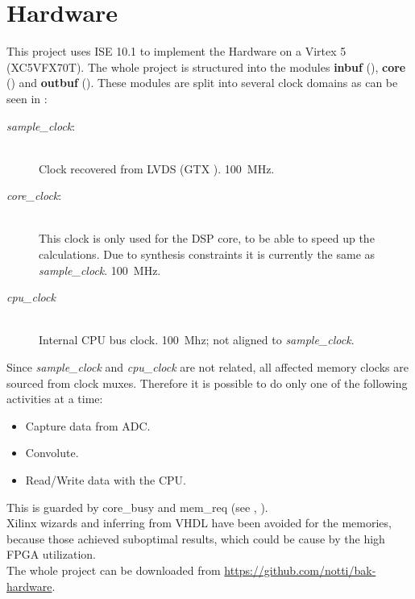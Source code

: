 \documentclass[11pt,technote,a4paper,onecolumn,dvips]{IEEEtran}
\newcommand{\signal}[1]{{\ttfamily #1}}
\newcommand{\module}[1]{{\ttfamily\bfseries #1}}
\newcommand{\clk}[1]{{\itshape\ttfamily #1}}
\begin{document}
\section{Hardware}
\label{sec:hardware}
This project uses ISE 10.1 to implement the Hardware on a Virtex 5 (XC5VFX70T).
The whole project is structured into the modules \module{inbuf}
(), \module{core} () and \module{outbuf}
(). These modules are split into several clock domains as can
be seen in :
\begin{description}
    \item[\clk{sample\_clock}:] \hfill \\
        Clock recovered from LVDS (GTX \cite[p. 179ff]{gtx}). \SI{100}{MHz}.
    \item[\clk{core\_clock}:] \hfill \\
        This clock is only used for the DSP core, to be able
        to speed up the calculations. Due to synthesis constraints it is
        currently the same as \clk{sample\_clock}. \SI{100}{MHz}.
    \item[\clk{cpu\_clock}] \hfill \\
        Internal CPU bus clock. \SI{100}{Mhz}; not aligned to
        \clk{sample\_clock}.
\end{description}
Since \clk{sample\_clock} and \clk{cpu\_clock} are not related, all affected memory
clocks are sourced from clock muxes. Therefore it is possible to do only
one of the following activities at a time:
\begin{itemize}
    \item Capture data from ADC.
    \item Convolute.
    \item Read/Write data with the CPU.
\end{itemize}
This is guarded by \signal{core\_busy} and \signal{mem\_req} (see
, ).\\
Xilinx wizards and inferring from VHDL have been avoided for the memories,
because those achieved suboptimal results, which could be cause by the
high FPGA utilization.\\
The whole project can be downloaded from
\url{https://github.com/notti/bak-hardware}.
\end{document}
